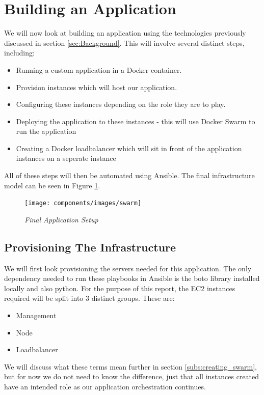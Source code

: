 \documentclass{article}
\begin{document}
\newpage
\section{Building an Application}
\label{sec:Build}
We will now look at building an application using the technologies previously discussed in section \ref{sec:Background}. This will involve several distinct steps, including:

\begin{itemize}
  \item Running a custom application in a Docker container.
  \item Provision instances which will host our application.
  \item Configuring these instances depending on the role they are to play.
  \item Deploying the application to these instances - this will use Docker Swarm to run the application
  \item Creating a Docker loadbalancer which will sit in front of the application instances on a seperate instance
\end{itemize}

All of these steps will then be automated using Ansible. The final infrastructure model can be seen in Figure \ref{fig:swarm}.

\begin{figure}[!h]
\centering
\texttt{[image: components/images/swarm]}
\caption{\em Final Application Setup}
\label{fig:swarm}
\end{figure}

\subsection{Provisioning The Infrastructure}
\label{subs:provision}
We will first look provisioning the servers needed for this application. The only dependency needed to run these playbooks in Ansible is the boto library \citep{Boto2016} installed locally and also python. For the purpose of this report, the EC2 instances required will be split into 3 distinct groups. These are:

\begin{itemize}
  \item Management
  \item Node
  \item Loadbalancer
\end{itemize}

We will discuss what these terms mean further in section \ref{subs:creating_swarm}, but for now we do not need to know the difference, just that all instances created have an intended role as our application orchestration continues.
\end{document}
